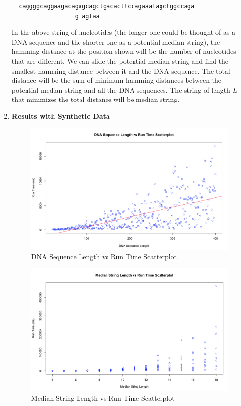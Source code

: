 \documentclass[paper=a4, fontsize=11pt]{scrartcl} %
\numberwithin{equation}{section} %
\numberwithin{figure}{section} %
\numberwithin{table}{section} %
\begin{document}
\begin{enumerate}
\begin{verbatim}  caggggcaggaagacagagcagctgacacttccagaaatagctggccaga
                  gtagtaa\end{verbatim}

In the above string of nucleotides (the longer one could be thought of as a DNA sequence and the shorter one as a potential median string), the hamming distance at the position shown will be the number of nucleotides that are different. We can slide the potential median string and find the smallest hamming distance between it and the DNA sequence. The total distance will be the sum of minimum hamming distances between the potential median string and all the DNA sequences. The string of length $L$ that minimizes the total distance will be median string.
\item \textbf{Results with Synthetic Data}

\begin{figure}[h]
\centering
\includegraphics[width=6.75in]{Figures/DNASeqLengthVsRunTimeScatterplot.png}
\caption{DNA Sequence Length vs Run Time Scatterplot}
\label{SeqLenVRunTime}
\end{figure}

\begin{figure}[h]
\centering
\includegraphics[width=6.75in]{Figures/MedianStringLengthvsRunTimeScatterplot.png}
\caption{Median String Length vs Run Time Scatterplot}
\label{MedLenVRunTime}
\end{figure}


\end{enumerate}
\end{document}
